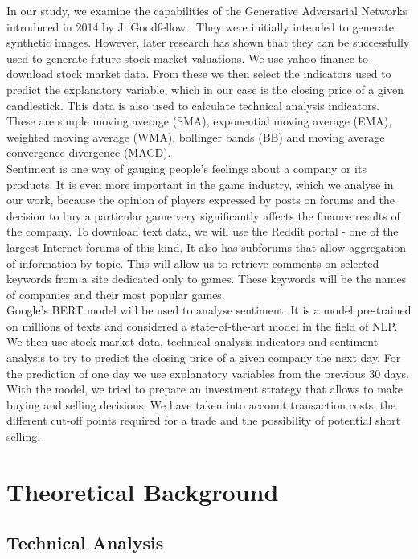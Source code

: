 \documentclass[11pt]{article} %
\begin{document}
In our study, we examine the capabilities of the Generative Adversarial Networks introduced in 2014 by J. Goodfellow \cite{gan1}. They were initially intended to generate synthetic images. However, later research has shown that they can be successfully used to generate future stock market valuations. We use yahoo finance to download stock market data. From these we then select the indicators used to predict the explanatory variable, which in our case is the closing price of a given candlestick. This data is also used to calculate technical analysis indicators. These are simple moving average (SMA), exponential moving average (EMA), weighted moving average (WMA), bollinger bands (BB) and moving average convergence divergence (MACD). \\

Sentiment is one way of gauging people's feelings about a company or its products. It is even more important in the game industry, which we analyse in our work, because the opinion of players expressed by posts on forums and the decision to buy a particular game very significantly affects the finance results of the company. To download text data, we will use the Reddit portal - one of the largest Internet forums of this kind. It also has subforums that allow aggregation of information by topic. This will allow us to retrieve comments on selected keywords from a site dedicated only to games. These keywords will be the names of companies and their most popular games. \\

Google's BERT model will be used to analyse sentiment. It is a model pre-trained on millions of texts and considered a state-of-the-art model in the field of NLP. 
We then use stock market data, technical analysis indicators and sentiment analysis to try to predict the closing price of a given company the next day. For the prediction of one day we use explanatory variables from the previous 30 days. With the model, we tried to prepare an investment strategy that allows to make buying and selling decisions. We have taken into account transaction costs, the different cut-off points required for a trade and the possibility of potential short selling. 


\section{Theoretical Background}

\subsection{Technical Analysis}
\end{document}
